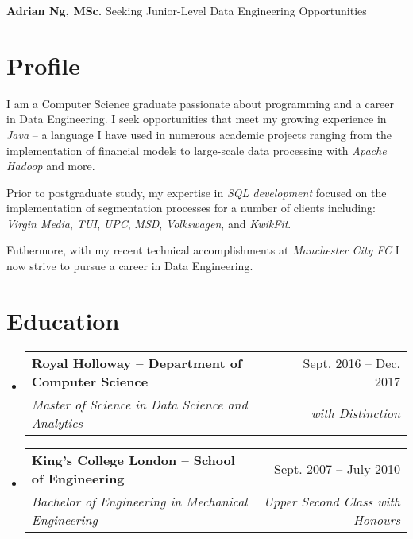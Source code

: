 \documentclass[letterpaper,11pt]{article}
\makeatletter
\newcommand{\resumeSubheading}[4]{
	\vspace{-1pt}\item
	\begin{tabular*}{0.97\textwidth}{l@{\extracolsep{\fill}}r}
		\textbf{#1} & #2 \\
		\textit{\small#3} & \textit{\small #4} \\
	\end{tabular*}\vspace{-5pt}
}
\newcommand{\resumeSubHeadingListStart}{\begin{itemize}[leftmargin=*]}
\newcommand{\resumeSubHeadingListEnd}{\end{itemize}}
\makeatother
\begin{document}
\begin{minipage}[c]{0.8\linewidth}
	\noindent
	\Large \textbf{Adrian Ng, MSc.}
	\newline
	\small
	Seeking Junior-Level Data Engineering Opportunities
	\section{Profile}
	\vspace{-0.5cm}
	\begin{multicols}{2}
		I am a Computer Science graduate passionate about programming and a career in Data Engineering. I seek opportunities that meet my growing experience in \textit{Java} -- a language I have used in numerous academic projects ranging from the implementation of financial models to large-scale data processing with \textit{Apache Hadoop} and more.

		Prior to postgraduate study, my expertise in \textit{SQL development} focused on the implementation of segmentation processes for a number of clients including: \textit{Virgin Media}, \textit{TUI}, \textit{UPC}, \textit{MSD}, \textit{Volkswagen}, and \textit{KwikFit}.

		Futhermore, with my recent technical accomplishments at \textit{Manchester City FC} I now strive to pursue a career in Data Engineering.
	\end{multicols}
	\section{Education}
	\resumeSubHeadingListStart

	\resumeSubheading
	{Royal Holloway -- Department of Computer Science}{Sept. 2016 -- Dec. 2017}
	{Master of Science in Data Science and Analytics}{with Distinction}

	\resumeSubheading
	{King's College London -- School of Engineering}{Sept. 2007 -- July 2010}
	{Bachelor of Engineering in Mechanical Engineering}{Upper Second Class with Honours}

	\resumeSubHeadingListEnd
\end{minipage} %
\hspace{0.2cm}
\end{document}
